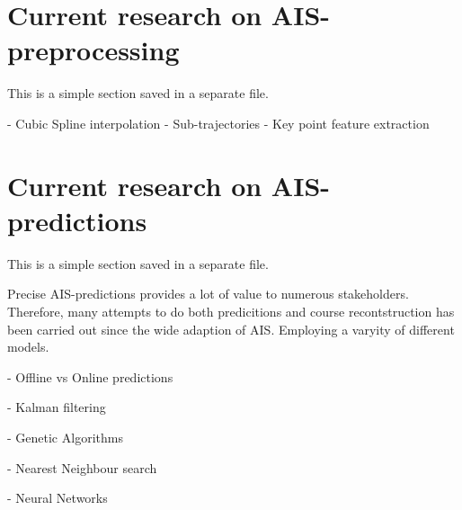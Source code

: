 \section{Current research on AIS-preprocessing}
\begin{info}{}
	This is a simple section saved in a separate file.
\end{info}
- Cubic Spline interpolation
- Sub-trajectories
- Key point feature extraction





\section{Current research on AIS-predictions}
\begin{info}{}
	This is a simple section saved in a separate file.
\end{info}
Precise AIS-predictions provides a lot of value to numerous stakeholders. Therefore, many attempts to do both predicitions and course recontstruction has been carried out since the wide adaption of AIS. Employing a varyity of different models.  

- Offline vs Online predictions

- Kalman filtering

- Genetic Algorithms

- Nearest Neighbour search

- Neural Networks







